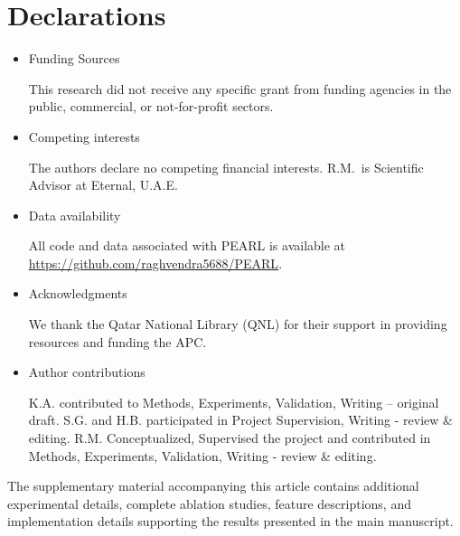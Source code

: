 \documentclass[pdflatex,sn-mathphys-num]{sn-jnl}%
\theoremstyle{thmstyleone}%
\theoremstyle{thmstyletwo}%
\theoremstyle{thmstylethree}%
\begin{document}
\section*{Declarations}
\begin{itemize}
\item Funding Sources

This research did not receive any specific grant from funding agencies in the public, commercial, or not-for-profit sectors.

\item Competing interests

The authors declare no competing financial interests. R.M.\ is Scientific Advisor at Eternal, U.A.E.

\item Data availability 

All code and data associated with PEARL is available at \url{https://github.com/raghvendra5688/PEARL}.

\item Acknowledgments

We thank the Qatar National Library (QNL) for their support in providing resources and funding the APC.

\item Author contributions

K.A. contributed to Methods, Experiments, Validation, Writing – original draft. S.G. and H.B. participated in Project Supervision, Writing - review \& editing. R.M. Conceptualized, Supervised the project and contributed in Methods, Experiments, Validation, Writing - review \& editing.
\end{itemize}


The supplementary material accompanying this article contains additional experimental details, complete ablation studies, feature descriptions, and implementation details supporting the results presented in the main manuscript.
\end{document}

